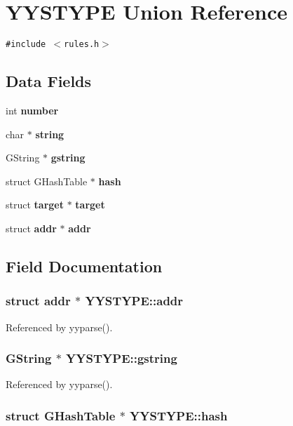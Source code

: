 \section{YYSTYPE Union Reference}
\label{union_y_y_s_t_y_p_e}
{\tt \#include $<$rules.h$>$}

\subsection*{Data Fields}
\begin{CompactItemize}
\item 
int {\bf number}
\item 
char $\ast$ {\bf string}
\item 
GString $\ast$ {\bf gstring}
\item 
struct GHashTable $\ast$ {\bf hash}
\item 
struct {\bf target} $\ast$ {\bf target}
\item 
struct {\bf addr} $\ast$ {\bf addr}
\end{CompactItemize}


\subsection{Field Documentation}
\subsubsection[{addr}]{\setlength{\rightskip}{0pt plus 5cm}struct {\bf addr} $\ast$ {\bf YYSTYPE::addr}\hspace{0.3cm}{\tt  [read]}}\label{union_y_y_s_t_y_p_e_1a4451fda26ef8f0486cf6c672cd7123}




Referenced by yyparse().
\subsubsection[{gstring}]{\setlength{\rightskip}{0pt plus 5cm}GString $\ast$ {\bf YYSTYPE::gstring}}\label{union_y_y_s_t_y_p_e_3adf89e07454c071e2d429b7ae8b6453}




Referenced by yyparse().
\subsubsection[{hash}]{\setlength{\rightskip}{0pt plus 5cm}struct GHashTable $\ast$ {\bf YYSTYPE::hash}\hspace{0.3cm}{\tt  [read]}}\label{union_y_y_s_t_y_p_e_6885ed17ddc8e2f23630bf9d20d7aefd}




